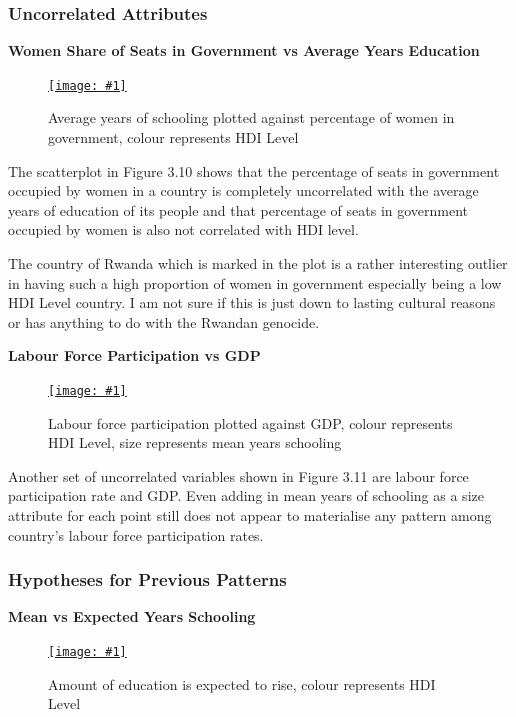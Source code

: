 \documentclass[11pt,a4paper,final]{article}
\newcommand\onlinefig[3]{
\begin{figure}[H]
  \centering
  \href{#3}{\texttt{[image: \#1]}}
  \caption{#2} 
  \label{fig:#1}
\end{figure}
}
\begin{document}
\begin{multicols}{2}
\subsubsection{Uncorrelated Attributes}
\begin{flushleft}
\textbf{Women Share of Seats in Government vs Average Years Education}
\end{flushleft}
\onlinefig{percentage_women_in_government_vs_mean_years_education_scatterplot.png}{Average years of schooling plotted against percentage of women in government, colour represents HDI Level}{https://public.tableau.com/views/CS3205-HDI/Sheet12?:language=en-GB&:display_count=n&:origin=viz_share_link}

The scatterplot in Figure 3.10 shows that the percentage of seats in government occupied by women in a country is completely uncorrelated with the average years of education of its people and that percentage of seats in government occupied by women is also not correlated with HDI level.

The country of Rwanda which is marked in the plot is a rather interesting outlier in having such a high proportion of women in government especially being a low HDI Level country. I am not sure if this is just down to lasting cultural reasons or has anything to do with the Rwandan genocide.

\begin{flushleft}
\textbf{Labour Force Participation vs GDP}
\end{flushleft}
\onlinefig{labour_force_participation_vs_gdp_scatterplot}{Labour force participation plotted against GDP, colour represents HDI Level, size represents mean years schooling}{https://public.tableau.com/views/CS3205-HDI/Sheet13?:language=en-GB&:display_count=n&:origin=viz_share_link}

Another set of uncorrelated variables shown in Figure 3.11 are labour force participation rate and GDP. Even adding in mean years of schooling as a size attribute for each point still does not appear to materialise any pattern among country's labour force participation rates.
\hfill\null
\columnbreak

\subsubsection{Hypotheses for Previous Patterns}
\begin{flushleft}
\textbf{Mean vs Expected Years Schooling}
\end{flushleft}
\vspace{-2cm}
\onlinefig{mean_vs_expected_years_schooling_scatterplot.png}{Amount of education is expected to rise, colour represents HDI Level}{https://public.tableau.com/views/CS3205-HDI/Sheet7?:language=en-GB&:display_count=n&:origin=viz_share_link}


\end{multicols}
\end{document}

